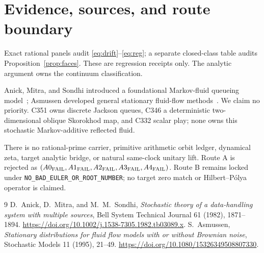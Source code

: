 \documentclass[10pt]{article}
\begin{document}
\section{Evidence, sources, and route boundary}
Exact rational panels audit \eqref{eq:drift}--\eqref{eq:reg}; a separate
closed-class table audits Proposition~\ref{prop:faces}.  These are regression
receipts only.  The analytic argument owns the continuum classification.

Anick, Mitra, and Sondhi introduced a foundational Markov-fluid queueing
model~\cite{AMS}; Asmussen developed general stationary fluid-flow
methods~\cite{Asm}.  We claim no priority.  C351 owns discrete Jackson queues,
C346 a deterministic two-dimensional oblique Skorokhod map, and C332 scalar
play; none owns this stochastic Markov-additive reflected fluid.

There is no rational-prime carrier, primitive arithmetic orbit ledger,
dynamical zeta, target analytic bridge, or natural same-clock unitary lift.
Route A is rejected as
$(A0_{\rm FAIL},A1_{\rm FAIL},A2_{\rm FAIL},A3_{\rm FAIL},A4_{\rm FAIL})$.
Route B remains locked under \texttt{NO\_BAD\_EULER\_OR\_ROOT\_NUMBER}; no
target zero match or Hilbert--P\'olya operator is claimed.

\enlargethispage{2\baselineskip}
\begin{thebibliography}{9}\small
{} D.~Anick, D.~Mitra, and M.~M.~Sondhi,
\emph{Stochastic theory of a data-handling system with multiple sources},
Bell System Technical Journal 61 (1982), 1871--1894.
\url{https://doi.org/10.1002/j.1538-7305.1982.tb03089.x}.
 S.~Asmussen,
\emph{Stationary distributions for fluid flow models with or without Brownian noise},
Stochastic Models 11 (1995), 21--49.
\url{https://doi.org/10.1080/15326349508807330}.
\end{thebibliography}
\fi
\end{document}
